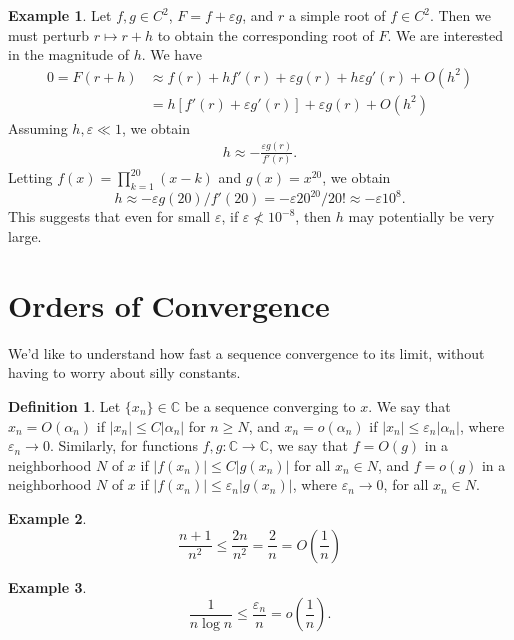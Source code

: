 \documentclass[12pt]{article}
\newcommand{\cc}{\mathbb{C}}
\newcommand{\ee}{\varepsilon}
\theoremstyle{plain}
\theoremstyle{definition}
\newtheorem*{definition}{Definition}
\newtheorem*{example}{Example}
\theoremstyle{remark}
\numberwithin{equation}{section}  %
\begin{document}
\begin{example}
Let $f, g \in C^2$, $F = f + \ee g$, and $r$ a simple root of $f \in C^2$.
Then we must perturb $r \mapsto r + h$ to obtain the corresponding
root of $F$. We are interested in the magnitude of $h$. We have
\begin{align*}
0 = F(r + h) & \approx f(r) + hf'(r) + \ee g(r) + h\ee g'(r) + O(h^2)
\\
& = h[f'(r)  + \ee g'(r)] + \ee g(r)  + O(h^2)
\end{align*}
Assuming $h, \ee \ll 1$, we obtain 
\begin{align*}
h \approx -\frac{\ee g(r)}{f'(r)}.
\end{align*}
Letting $f(x) = \prod_{k=1}^{20} (x-k)$ and $g(x) = x^{20}$, we obtain
\[h \approx -\ee g(20)/f'(20) = -\ee 20^20/20! \approx -\ee 10^8.\]
This suggests that even for small $\ee$, if $\ee \not < 10^{-8}$,
then $h$ may potentially be very large. 
\end{example}
\section{Orders of Convergence}
We'd like to understand how fast a sequence convergence to its limit, without
having to worry about silly constants.
\begin{definition}
Let $\{x_{n}\} \in \mathbb{C}$ be a sequence converging to $x$. We say that
$x_{n} = O(\alpha_{n})$ if $|x_{n}| \le C |\alpha_{n}|$  for $n \ge N$, and $ x_n 
= o(\alpha_n )$ if $|x_n| \le \ee_n |\alpha_n |$, where $\ee_n \to 0$.
Similarly, for functions $f,g: \cc \to \cc$, we say that $f = O(g)$ in a
neighborhood $N$ of $x$ if $|f(x_n) | \le C |g(x_n)|$ for all $x_n \in N$, and 
$f = o(g)$ in a neighborhood $N$ of $x$ if $|f(x_n) | \le \ee_n |g(x_n)|$,
where $\ee_n \to 0$,  for all $x_n \in N$.
\end{definition}

\begin{example}
\begin{equation*}
\frac{n+1}{n^2} \le \frac{2n}{n^2} = \frac{2}{n} = O\left(\frac{1}{n} \right)	
\end{equation*}
\end{example}
\begin{example}
\begin{equation*}
\frac{1}{n \log n} \le \frac{\ee_n}{n} = o\left(\frac{1}{n}\right).
\end{equation*}
\end{example}
\end{document}
